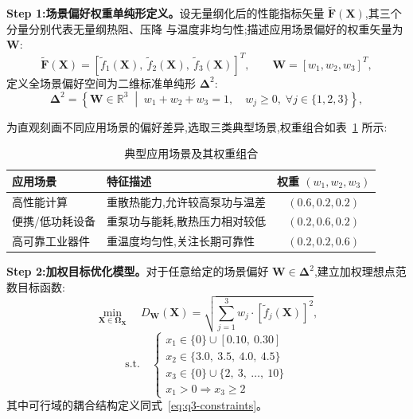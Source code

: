 \textbf{Step 1:场景偏好权重单纯形定义。}设无量纲化后的性能指标矢量
$\mathbf{\tilde{F}}(\mathbf{X})$,其三个分量分别代表无量纲热阻、压降
与温度非均匀性;描述应用场景偏好的权重矢量为 $\mathbf{W}$:
\begin{equation}
  \mathbf{\tilde{F}}(\mathbf{X}) = \left[ \tilde{f}_1(\mathbf{X}),\
    \tilde{f}_2(\mathbf{X}),\ \tilde{f}_3(\mathbf{X}) \right]^T, \qquad
  \mathbf{W} = \left[ w_1, w_2, w_3 \right]^T,
  \label{eq:weight-vector}
\end{equation}
定义全场景偏好空间为二维标准单纯形 $\boldsymbol{\Delta}^2$:
\begin{equation}
  \boldsymbol{\Delta}^2 = \left\{ \mathbf{W} \in \mathbb{R}^3
  \;\middle\vert\; w_1 + w_2 + w_3 = 1, \quad w_j \ge 0, \;
  \forall j \in \{1,2,3\} \right\},
  \label{eq:weight-simplex}
\end{equation}

为直观刻画不同应用场景的偏好差异,选取三类典型场景,权重组合如表~\ref{tab:scenarios} 所示:

\begin{table}[htbp]
  \centering
  \caption{典型应用场景及其权重组合}
  \label{tab:scenarios}
  \begin{tabular}{llc}
    \toprule
    应用场景     & 特征描述            & 权重 $(w_1, w_2, w_3)$ \\
    \midrule
    高性能计算    & 重散热能力,允许较高泵功与温差 & $(0.6, 0.2, 0.2)$    \\
    便携/低功耗设备 & 重泵功与能耗,散热压力相对较低 & $(0.2, 0.6, 0.2)$    \\
    高可靠工业器件  & 重温度均匀性,关注长期可靠性  & $(0.2, 0.2, 0.6)$    \\
    \bottomrule
  \end{tabular}
\end{table}

\textbf{Step 2:加权目标优化模型。}对于任意给定的场景偏好
$\mathbf{W} \in \boldsymbol{\Delta}^2$,建立加权理想点范数目标函数:
\begin{equation}
  \min_{\mathbf{X} \in \boldsymbol{\Omega}_{\mathbf{X}}} \quad
  D_{\mathbf{W}}(\mathbf{X}) = \sqrt{ \sum_{j=1}^{3} w_j \cdot
    \left[ \tilde{f}_j(\mathbf{X}) \right]^2 },
  \label{eq:weighted-objective}
\end{equation}
\begin{equation}
  \text{s.t.} \quad \begin{cases}
    x_1 \in \{0\} \cup [0.10,\ 0.30]          \\
    x_2 \in \{3.0,\ 3.5,\ 4.0,\ 4.5\}         \\
    x_3 \in \{0\} \cup \{2,\ 3,\ \dots,\ 10\} \\
    x_1 > 0 \Rightarrow x_3 \ge 2
  \end{cases}
  \label{eq:q4-constraints}
\end{equation}
其中可行域的耦合结构定义同式~\eqref{eq:q3-constraints}。

